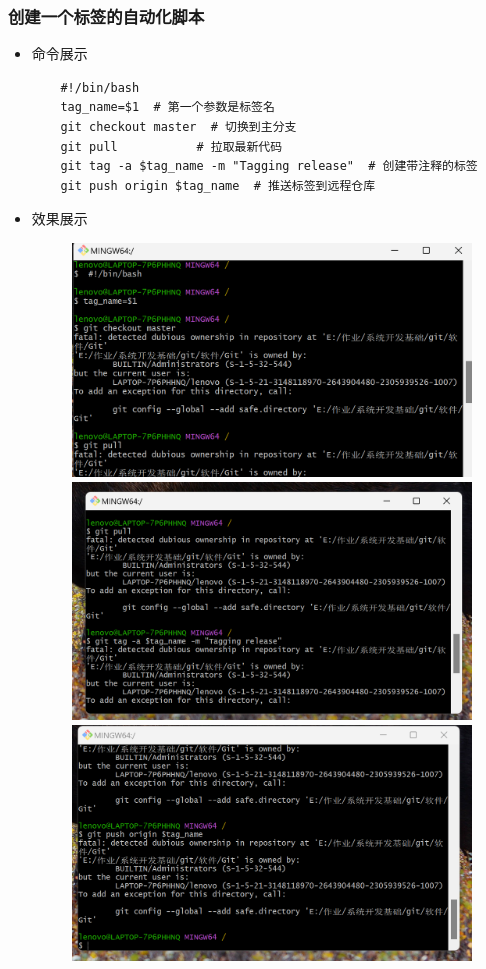 \documentclass[UTF8]{ctexart}
\begin{document}
\subsubsection{创建一个标签的自动化脚本}
\begin{itemize}
  \item 命令展示
  \begin{verbatim}
    #!/bin/bash
    tag_name=$1  # 第一个参数是标签名
    git checkout master  # 切换到主分支
    git pull           # 拉取最新代码
    git tag -a $tag_name -m "Tagging release"  # 创建带注释的标签
    git push origin $tag_name  # 推送标签到远程仓库
  \end{verbatim}

  \item 效果展示
  \begin{figure}[H]
    \centering
\includegraphics[width=1\textwidth]{18}
\includegraphics[width=1\textwidth]{19}
\includegraphics[width=1\textwidth]{20}


\end{figure}
\end{itemize}
\end{document}
